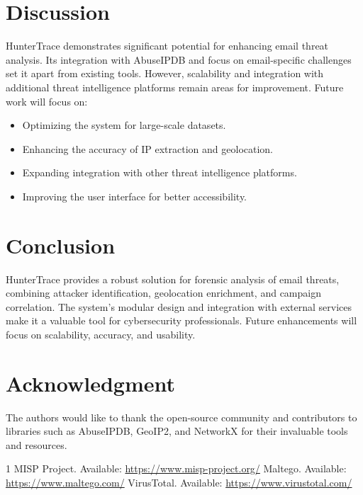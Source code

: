 \documentclass[conference]{IEEEtran}
\begin{document}
\section{Discussion}
HunterTrace demonstrates significant potential for enhancing email threat analysis. Its integration with AbuseIPDB and focus on email-specific challenges set it apart from existing tools. However, scalability and integration with additional threat intelligence platforms remain areas for improvement. Future work will focus on:
\begin{itemize}
    \item Optimizing the system for large-scale datasets.
    \item Enhancing the accuracy of IP extraction and geolocation.
    \item Expanding integration with other threat intelligence platforms.
    \item Improving the user interface for better accessibility.
\end{itemize}

\section{Conclusion}
HunterTrace provides a robust solution for forensic analysis of email threats, combining attacker identification, geolocation enrichment, and campaign correlation. The system's modular design and integration with external services make it a valuable tool for cybersecurity professionals. Future enhancements will focus on scalability, accuracy, and usability.

\section*{Acknowledgment}
The authors would like to thank the open-source community and contributors to libraries such as AbuseIPDB, GeoIP2, and NetworkX for their invaluable tools and resources.

\begin{thebibliography}{1}
 MISP Project. Available: \url{https://www.misp-project.org/}
 Maltego. Available: \url{https://www.maltego.com/}
 VirusTotal. Available: \url{https://www.virustotal.com/}
\end{thebibliography}
\end{document}
